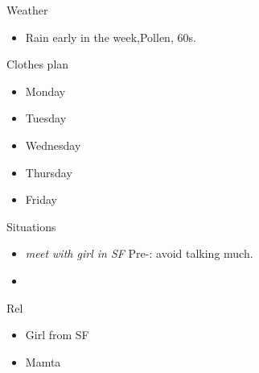 \documentclass[serif, mathserif, final]{beamer}
\begin{document}
\begin{frame}
\begin{columns}
\begin{column}{0.20\linewidth}
      \begin{block}{Weather} 
        \begin{itemize}
          \tiny \item \tiny Rain early in the week,Pollen, 60s. 
        \end{itemize}
      \end{block} 

      \begin{block}{Clothes plan} 
        \begin{itemize}
          \tiny \item \tiny Monday
        \item \tiny Tuesday
        \item \tiny Wednesday
        \item \tiny Thursday
        \item \tiny Friday
        \end{itemize} 
      \end{block}

      \begin{block}{Situations}

        \begin{itemize}
        \tiny \item \tiny \textit{meet with girl in SF} Pre-: avoid
        talking much.
      \item \tiny 
        \end{itemize} 
      \end{block} 

\begin{block}{Rel}
  \begin{itemize} 
    \small \item \small Girl from SF 
    \small \item \small Mamta 
  \end{itemize} 
\end{block} 
\end{column}%
\end{columns}
\end{frame}
\end{document}
